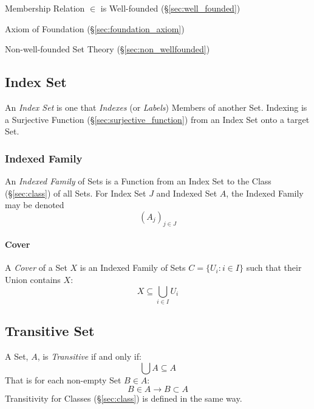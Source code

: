 Membership Relation $\in$ is Well-founded (\S\ref{sec:well_founded})

Axiom of Foundation (\S\ref{sec:foundation_axiom})

Non-well-founded Set Theory (\S\ref{sec:non_wellfounded})



\subsection{Index Set}\label{sec:index_set}

An \emph{Index Set} is one that \emph{Indexes} (or \emph{Labels})
Members of another Set. Indexing is a Surjective Function
(\S\ref{sec:surjective_function}) from an Index Set onto a target Set.



\subsubsection{Indexed Family}\label{sec:indexed_family}

An \emph{Indexed Family} of Sets is a Function from an Index Set to
the Class (\S\ref{sec:class}) of all Sets. For Index Set $J$ and
Indexed Set $A$, the Indexed Family may be denoted
\[
  (A_j)_{j \in J}
\]



\paragraph{Cover}\label{sec:cover}\hfill

A \emph{Cover} of a Set $X$ is an Indexed Family of Sets $C = \{ U_i :
i \in I \}$ such that their Union contains $X$:
\[
  X \subseteq \bigcup_{i \in I} U_i
\]



\subsection{Transitive Set}\label{sec:transitive_set}

A Set, $A$, is \emph{Transitive} if and only if:
\[
  \bigcup A \subseteq A
\]
That is for each non-empty Set $B \in A$:
\[
  B \in A \rightarrow B \subset A
\]
Transitivity for Classes (\S\ref{sec:class}) is defined in the same
way.


